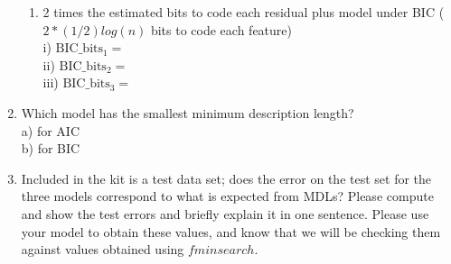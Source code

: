 \begin{enumerate}
\begin{enumerate}
\item 2 times the estimated bits to code each residual plus model under BIC  ($2*(1/2) log(n)$ bits to code each feature) \\
i)   $\text{BIC}\_\text{bits}_1 = $ \\
ii)  $\text{BIC}\_\text{bits}_2 = $ \\
iii) $\text{BIC}\_\text{bits}_3 = $ \\

\end{enumerate}


\item Which model has the smallest minimum description length? \\
a) for AIC \\
b) for BIC\\


\item  Included in the kit is a test data set; does the error on the test set for the three models
   correspond to what is expected from MDLs?  Please compute and show the test errors and briefly explain it in one sentence. Please use your model to obtain these values, and know that we will be checking them against values obtained using $fminsearch$.


\end{enumerate}

